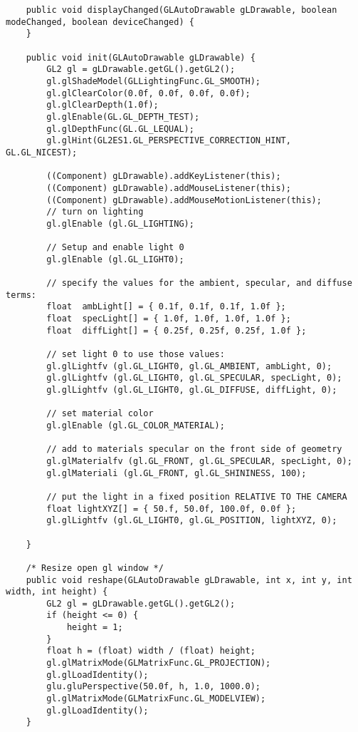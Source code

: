 \begin{lstlisting}
    public void displayChanged(GLAutoDrawable gLDrawable, boolean modeChanged, boolean deviceChanged) {
    }
 
    public void init(GLAutoDrawable gLDrawable) {
        GL2 gl = gLDrawable.getGL().getGL2();
        gl.glShadeModel(GLLightingFunc.GL_SMOOTH);
        gl.glClearColor(0.0f, 0.0f, 0.0f, 0.0f);
        gl.glClearDepth(1.0f);
        gl.glEnable(GL.GL_DEPTH_TEST);
        gl.glDepthFunc(GL.GL_LEQUAL);
        gl.glHint(GL2ES1.GL_PERSPECTIVE_CORRECTION_HINT, GL.GL_NICEST);

        ((Component) gLDrawable).addKeyListener(this);
		((Component) gLDrawable).addMouseListener(this);
	    ((Component) gLDrawable).addMouseMotionListener(this);
	    // turn on lighting
	    gl.glEnable (gl.GL_LIGHTING);
		
       	// Setup and enable light 0
	    gl.glEnable (gl.GL_LIGHT0);
		
	    // specify the values for the ambient, specular, and diffuse terms:
	    float  ambLight[] = { 0.1f, 0.1f, 0.1f, 1.0f };
	    float  specLight[] = { 1.0f, 1.0f, 1.0f, 1.0f };
	    float  diffLight[] = { 0.25f, 0.25f, 0.25f, 1.0f };
		
	    // set light 0 to use those values:
	    gl.glLightfv (gl.GL_LIGHT0, gl.GL_AMBIENT, ambLight, 0);
		gl.glLightfv (gl.GL_LIGHT0, gl.GL_SPECULAR, specLight, 0);
	    gl.glLightfv (gl.GL_LIGHT0, gl.GL_DIFFUSE, diffLight, 0);
		
	    // set material color
	    gl.glEnable (gl.GL_COLOR_MATERIAL);
		
		// add to materials specular on the front side of geometry
	    gl.glMaterialfv (gl.GL_FRONT, gl.GL_SPECULAR, specLight, 0);
	    gl.glMateriali (gl.GL_FRONT, gl.GL_SHININESS, 100);
		
	    // put the light in a fixed position RELATIVE TO THE CAMERA
	    float lightXYZ[] = { 50.f, 50.0f, 100.0f, 0.0f };
	    gl.glLightfv (gl.GL_LIGHT0, gl.GL_POSITION, lightXYZ, 0);
		
    }
 
	/* Resize open gl window */
    public void reshape(GLAutoDrawable gLDrawable, int x, int y, int width, int height) {
        GL2 gl = gLDrawable.getGL().getGL2();
        if (height <= 0) {
            height = 1;
        }
        float h = (float) width / (float) height;
        gl.glMatrixMode(GLMatrixFunc.GL_PROJECTION);
        gl.glLoadIdentity();
        glu.gluPerspective(50.0f, h, 1.0, 1000.0);
        gl.glMatrixMode(GLMatrixFunc.GL_MODELVIEW);
        gl.glLoadIdentity();
    }
 

\end{lstlisting}
